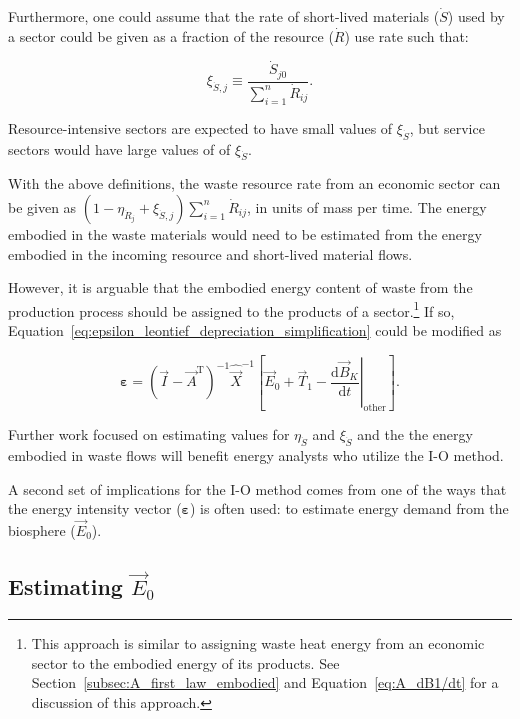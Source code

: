 Furthermore, one could assume that the rate
of short-lived materials ($\dot{S}$) used by a sector could be given as a 
fraction of the resource ($\dot{R}$) use rate such that:

\begin{equation}
	\xi_{\dot{S},j}
	\equiv \frac{\dot{S}_{j0}}{\sum\limits_{i=1}^{n} \dot{R}_{ij}}.
\end{equation} 

\noindent{}Resource-intensive sectors are expected to have small values of $\xi_{\dot{S}}$,
but service sectors would have large values of of $\xi_{\dot{S}}$.

With the above definitions, the waste resource rate from an economic sector
can be given as
$(1 - \eta_{\dot{R}_{j}} + \xi_{\dot{S},j}) \sum\limits_{i=1}^{n} \dot{R}_{ij}$,
in units of mass per time.
The energy embodied in the waste materials would need to be estimated
from the energy embodied in the incoming resource and short-lived material flows.

However, it is arguable that the embodied energy content 
of waste from the production process should be 
assigned to the products of a sector.\footnote{This approach 
is similar to assigning waste heat energy from an
economic sector to the embodied energy of its products.
See Section~\ref{subsec:A_first_law_embodied} and
Equation~\ref{eq:A_dB1/dt} for a discussion of this approach.}
If so, Equation~\ref{eq:epsilon_leontief_depreciation_simplification}
could be modified as

\begin{equation} \label{eq:epsilon_leontief_without_waste}
	\bm{\varepsilon} 
	= {(\vec{I} - \vec{A}^{\mathrm{T}})}^{-1}\hat{\vec{X}}^{-1}
		\left[\vec{E}_{0} 
				+ \vec{T}_{1} 
				- \left. \frac{\mathrm{d}\vec{B}_{K}}{\mathrm{d}t} \right|_{\mathrm{other}}
		\right].
\end{equation}

Further work focused on estimating values for 
$\eta_{\dot{S}}$ and $\xi_{\dot{S}}$
and the the energy embodied in waste flows 
will benefit energy analysts who utilize the I-O method.

A second set of implications for the I-O method 
comes from one of the ways that 
the energy intensity vector ($\bm{\varepsilon}$)
is often used: to estimate energy demand from the biosphere ($\vec{E}_{0}$).


\subsection{Estimating $\vec{E}_{0}$}

